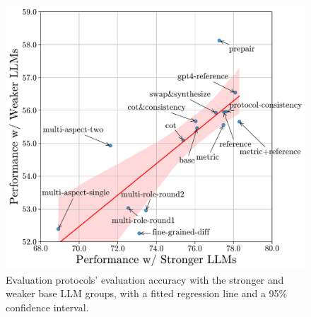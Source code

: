 \documentclass[11pt]{article}
\begin{document}
\begin{figure}[t!]
    \centering
    \includegraphics[width=1\linewidth]{figures/protocol_analysis_group_performance.pdf}
 \caption{\label{fig:protocol-performance-group}Evaluation protocols' evaluation accuracy with the stronger and weaker base LLM groups, with a fitted regression line and a 95\% confidence interval.
    }
\end{figure}
\end{document}
